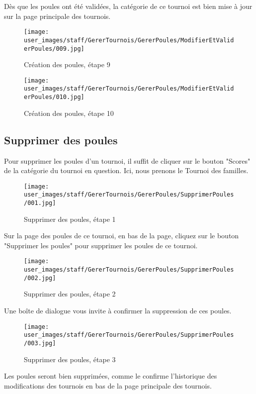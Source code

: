 Dès que les poules ont été validées, la catégorie de ce tournoi est bien mise à jour sur la page principale des tournois.

\begin{figure}[H]
\centering
\texttt{[image: user\_images/staff/GererTournois/GererPoules/ModifierEtValiderPoules/009.jpg]}
\caption{Création des poules, étape 9}
\end{figure}

\begin{figure}[H]
\centering
\texttt{[image: user\_images/staff/GererTournois/GererPoules/ModifierEtValiderPoules/010.jpg]}
\caption{Création des poules, étape 10}
\end{figure}

\subsection{Supprimer des poules}

Pour supprimer les poules d'un tournoi, il suffit de cliquer sur le bouton "Scores" de la catégorie du tournoi en question. Ici, nous prenons le Tournoi des familles.

\begin{figure}[H]
\centering
\texttt{[image: user\_images/staff/GererTournois/GererPoules/SupprimerPoules/001.jpg]}
\caption{Supprimer des poules, étape 1}
\end{figure}

Sur la page des poules de ce tournoi, en bas de la page, cliquez sur le bouton "Supprimer les poules" pour supprimer les poules de ce tournoi.

\begin{figure}[H]
\centering
\texttt{[image: user\_images/staff/GererTournois/GererPoules/SupprimerPoules/002.jpg]}
\caption{Supprimer des poules, étape 2}
\end{figure}

Une boîte de dialogue vous invite à confirmer la suppression de ces poules.

\begin{figure}[H]
\centering
\texttt{[image: user\_images/staff/GererTournois/GererPoules/SupprimerPoules/003.jpg]}
\caption{Supprimer des poules, étape 3}
\end{figure}

Les poules seront bien supprimées, comme le confirme l'historique des modifications des tournois en bas de la page principale des tournois.

